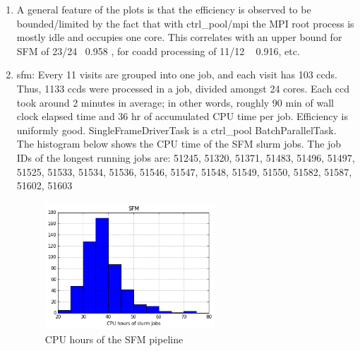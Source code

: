 \documentclass[DM,authoryear,toc]{lsstdoc}
\begin{document}
\begin{enumerate}
\item
A general feature of the plots is that the efficiency is observed to be bounded/limited by the fact that with ctrl{\_}pool/mpi the MPI root process is mostly idle and occupies one core.  This correlates with an upper bound for SFM of 23/24 ~0.958 , for coadd processing of 11/12 ~ 0.916, etc.

\item
sfm: Every 11 visits are grouped into one job, and each visit has 103 ccds. Thus, 1133 ccds were processed in a job, divided amongst 24 cores. Each ccd took around 2 minutes in average; in other words, roughly 90 min of wall clock elapsed time and 36 hr of accumulated CPU time per job. Efficiency is uniformly good. SingleFrameDriverTask is a ctrl{\_}pool BatchParallelTask.  The histogram below shows the CPU time of the SFM slurm jobs. The job IDs of the longest running jobs are: 51245, 51320, 51371, 51483, 51496, 51497, 51525, 51533, 51534, 51536, 51546, 51547, 51548, 51549, 51550, 51582, 51587, 51602, 51603
\begin{figure}[htbp]
        \begin{center}
                 \includegraphics[width=0.6\textwidth]{figures/cpu_sfm}
                 \caption{CPU hours of the SFM pipeline}
                 \label{fig:cpu_sfm}
        \end{center}
\end{figure}


\end{enumerate}
\end{document}

